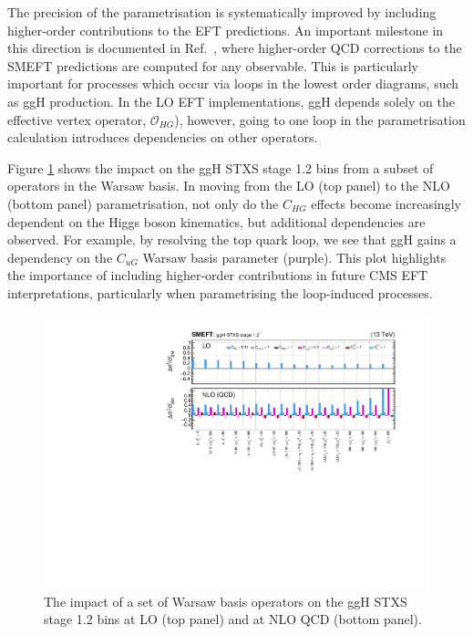 The precision of the parametrisation is systematically improved by including higher-order contributions to the EFT predictions. An important milestone in this direction is documented in Ref.~\cite{Degrande:2020evl}, where higher-order QCD corrections to the SMEFT predictions are computed for any observable. This is particularly important for processes which occur via loops in the lowest order diagrams, such as ggH production. In the LO EFT implementations, ggH depends solely on the effective vertex operator, $\mathcal{O}_{HG}$), however, going to one loop in the parametrisation calculation introduces dependencies on other operators.

Figure \ref{fig:smeftatnlo} shows the impact on the ggH STXS stage 1.2 bins from a subset of operators in the Warsaw basis. In moving from the LO (top panel) to the NLO (bottom panel) parametrisation, not only do the $C_{HG}$ effects become increasingly dependent on the Higgs boson kinematics, but additional dependencies are observed. For example, by resolving the top quark loop, we see that ggH gains a dependency on the $C_{uG}$ Warsaw basis parameter (purple). This plot highlights the importance of including higher-order contributions in future CMS EFT interpretations, particularly when parametrising the loop-induced processes.

\begin{figure}[htb!]
  \centering
  \includegraphics[width=1\textwidth]{Figures/eft/smeft/SMEFTatNLO.pdf}
  \caption[SMEFT at NLO QCD for ggH]
  {
    The impact of a set of Warsaw basis operators on the ggH STXS stage 1.2 bins at LO (top panel) and at NLO QCD (bottom panel).
  }
  \label{fig:smeftatnlo}
\end{figure}

